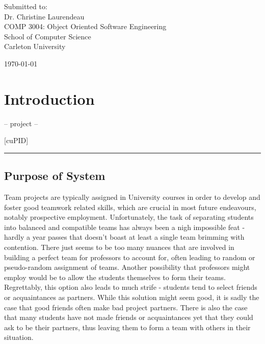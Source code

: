 \documentclass[12pt,letterpaper]{article}
\begin{document}
\vfill

\begin{center}
	Submitted to:\\
	Dr. Christine Laurendeau\\
	COMP 3004: Object Oriented Software Engineering\\
	School of Computer Science\\
	Carleton University
\end{center}

\vspace{2em}

\begin{center}
	\today
\end{center}

\newpage{}

\tableofcontents{}

\renewcommand{\listfigurename}{Figures}
\listoffigures

\renewcommand{\listtablename}{Tables}
\listoftables

\newpage{}

\section{Introduction}

\begin{center}
    -- project --
\end{center}

\begin{center}
	\Huge [cuPID]
\end{center}

\begin{center}
    \rule{0.85\textwidth}{0.5pt}
\end{center}

\subsection{Purpose of System}

Team projects are typically assigned in University courses in order to develop and foster
good teamwork related skills, which are crucial in most future endeavours, notably 
prospective employment. Unfortunately, the task of separating students into balanced 
and compatible teams has always been a nigh impossible feat - hardly a year passes that doesn't
boast at least a single team brimming with  contention. There just seems to be too many
nuances that are involved in building a perfect team for professors to account for, often leading
to random or pseudo-random assignment of teams. Another possibility that professors might employ
would be to allow the students themselves to form their teams. Regrettably, this option also
leads to much strife - students tend to select friends or acquaintances as partners. While this
solution might seem good, it is sadly the case that good friends often make bad project partners. 
There is also the case that many students have not made friends or acquaintances yet that they 
could ask to be their partners, thus leaving them to form a team with others in their situation.
\end{document}
